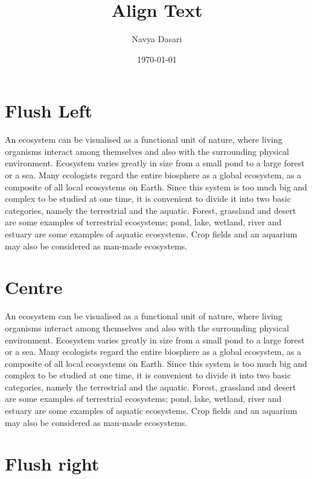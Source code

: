 \documentclass[12pt]{article}
\title{Align Text}
\author{Navya Dasari}
\date{\today}
\begin{document}
	\maketitle
	\section{Flush Left}
	
	\begin{flushleft}
		An ecosystem can be visualised as a functional unit of nature, where living 
		organisms interact among themselves and also with the surrounding physical 
		environment. Ecosystem varies greatly in size from a small pond to a large forest or a 
		sea. Many ecologists regard the entire biosphere as a global ecosystem, as a composite 
		of all local ecosystems on Earth. Since this system is too much big and complex to be 
		studied at one time, it is convenient to divide it into two basic categories, namely the 
		terrestrial and the aquatic. Forest, grassland and desert are some examples of terrestrial 
		ecosystems; pond, lake, wetland, river and estuary are some examples of aquatic 
		ecosystems. Crop fields and an aquarium may also be considered as man-made 
		ecosystems.
	\end{flushleft}
	
	\section{Centre}
	
	\begin{Center}
		An ecosystem can be visualised as a functional unit of nature, where living 
		organisms interact among themselves and also with the surrounding physical 
		environment. Ecosystem varies greatly in size from a small pond to a large forest or a 
		sea. Many ecologists regard the entire biosphere as a global ecosystem, as a composite 
		of all local ecosystems on Earth. Since this system is too much big and complex to be 
		studied at one time, it is convenient to divide it into two basic categories, namely the 
		terrestrial and the aquatic. Forest, grassland and desert are some examples of terrestrial 
		ecosystems; pond, lake, wetland, river and estuary are some examples of aquatic 
		ecosystems. Crop fields and an aquarium may also be considered as man-made 
		ecosystems.
	\end{Center}
		
	\section{Flush right}
	
\end{document}
